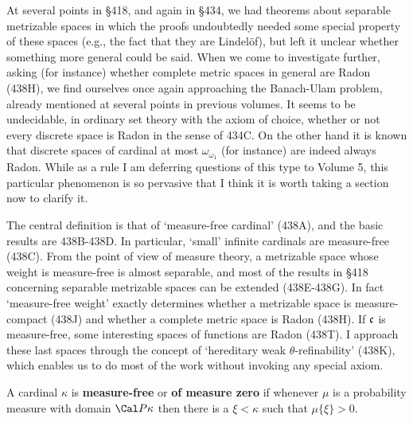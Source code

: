 
\def\Marik{Ma\v r\'\i k}

\def\chaptername{Topologies and measures II}
\def\sectionname{Measure-free cardinals}


At several points in \S418, and again in \S434, we had theorems about
separable metrizable spaces in which the proofs undoubtedly needed some
special property of these spaces (e.g., the fact that they are
Lindel\"of), but left it unclear whether something more general could be
said.   When we come to investigate further, asking (for instance)
whether complete metric spaces in general are Radon (438H), we find
ourselves once again approaching the
Banach-Ulam problem, already mentioned at several points in previous
volumes.
It seems to be undecidable, in
ordinary set theory with the axiom of choice, whether or not every
discrete space is Radon in the sense of 434C.
On the other hand it
is known that discrete spaces of cardinal at most $\omega_{\omega_1}$ (for
instance) are indeed always Radon.   While as a rule I am deferring
questions of this type to Volume 5, this particular phenomenon is so
pervasive that I think it is worth taking a section now to clarify it.

The central definition is that of `measure-free cardinal' (438A), and
the basic results are 438B-438D.   In particular, `small' infinite
cardinals are measure-free (438C).   From the point of view of
measure theory, a metrizable space whose weight is measure-free is
almost separable, and most of the results in \S418 concerning separable
metrizable spaces can be extended (438E-438G).   In fact `measure-free
weight' exactly determines whether a metrizable space is
measure-compact (438J) and whether a complete metric
space is Radon (438H).   If $\frak c$ is measure-free, some
interesting spaces of functions are Radon (438T).   I approach these
last spaces through the concept of `hereditary weak
$\theta$-refinability' (438K), which enables us to do most of the work
without invoking any special axiom.

 A cardinal
$\kappa$ is {\bf measure-free} or {\bf of measure zero} if whenever
$\mu$ is a
probability measure with domain $\Cal P\kappa$ then there is a
$\xi<\kappa$ such that $\mu\{\xi\}>0$.

